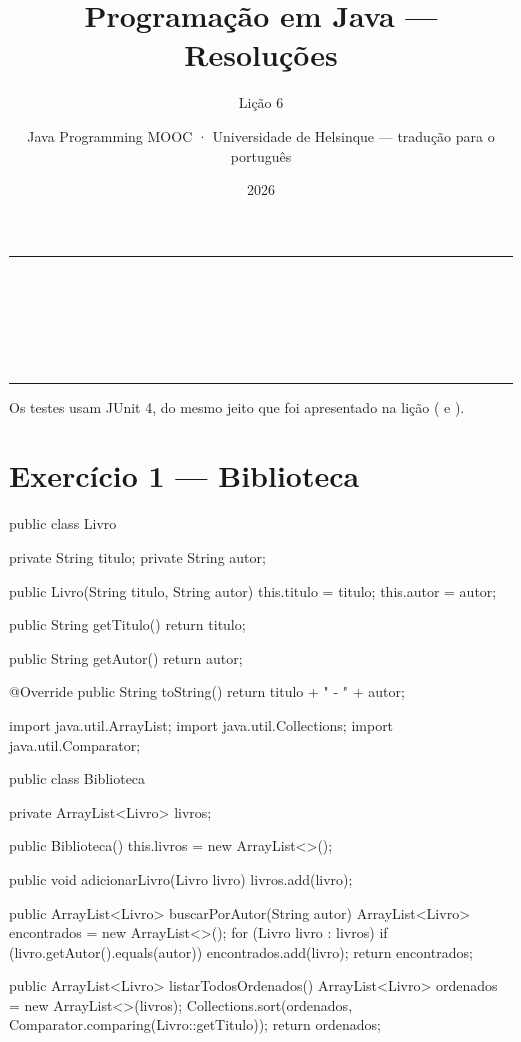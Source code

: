 \documentclass[11pt,a4paper]{article}
\title{Programação em Java — Resoluções}
\subtitle{Lição 6}
\author{Java Programming MOOC · Universidade de Helsinque — tradução para o português}
\date{2026}
\makeatletter
\renewcommand{\maketitle}{%
  \begin{center}
    {\color{javaRule}\rule{\linewidth}{1pt}}\\[6pt]
    {\Huge\sffamily\bfseries\color{javaOrange} \@title}\\[6pt]
    \ifx\@subtitle\undefined\else
      {\Large\sffamily\color{javaDeep} \@subtitle}\\[4pt]
    \fi
    {\small\sffamily\color{gray} \@author}\\[2pt]
    {\small\sffamily\color{gray} \@date}\\[6pt]
    {\color{javaRule}\rule{\linewidth}{1pt}}
  \end{center}
  \vspace{1em}
}
\makeatother
\begin{document}
\maketitle
\tableofcontents
\vspace{1.5em}

Os testes usam JUnit 4, do mesmo jeito que foi apresentado na lição ( e ).

\section{Exercício 1 --- Biblioteca}

\begin{javacode}
public class Livro {
    private String titulo;
    private String autor;

    public Livro(String titulo, String autor) {
        this.titulo = titulo;
        this.autor = autor;
    }

    public String getTitulo() {
        return titulo;
    }

    public String getAutor() {
        return autor;
    }

    @Override
    public String toString() {
        return titulo + " - " + autor;
    }
}
\end{javacode}

\begin{javacode}
import java.util.ArrayList;
import java.util.Collections;
import java.util.Comparator;

public class Biblioteca {
    private ArrayList<Livro> livros;

    public Biblioteca() {
        this.livros = new ArrayList<>();
    }

    public void adicionarLivro(Livro livro) {
        livros.add(livro);
    }

    public ArrayList<Livro> buscarPorAutor(String autor) {
        ArrayList<Livro> encontrados = new ArrayList<>();
        for (Livro livro : livros) {
            if (livro.getAutor().equals(autor)) {
                encontrados.add(livro);
            }
        }
        return encontrados;
    }

    public ArrayList<Livro> listarTodosOrdenados() {
        ArrayList<Livro> ordenados = new ArrayList<>(livros);
        Collections.sort(ordenados, Comparator.comparing(Livro::getTitulo));
        return ordenados;
    }
}
\end{javacode}
\end{document}
